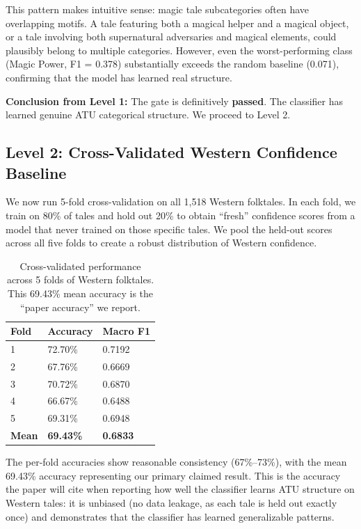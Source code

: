 \documentclass{article}
\begin{document}
This pattern makes intuitive sense: magic tale subcategories often have overlapping motifs. A tale featuring both a magical helper and a magical object, or a tale involving both supernatural adversaries and magical elements, could plausibly belong to multiple categories. However, even the worst-performing class (Magic Power, F1 = 0.378) substantially exceeds the random baseline (0.071), confirming that the model has learned real structure.

\textbf{Conclusion from Level 1:} The gate is definitively \textbf{passed}. The classifier has learned genuine ATU categorical structure. We proceed to Level 2.

\subsection{Level 2: Cross-Validated Western Confidence Baseline}

We now run 5-fold cross-validation on all 1,518 Western folktales. In each fold, we train on 80\% of tales and hold out 20\% to obtain ``fresh'' confidence scores from a model that never trained on those specific tales. We pool the held-out scores across all five folds to create a robust distribution of Western confidence.

\begin{table}[h]
\centering
\small
\begin{tabular}{lll}
\toprule
\textbf{Fold} & \textbf{Accuracy} & \textbf{Macro F1} \\
\midrule
1 & 72.70\% & 0.7192 \\
2 & 67.76\% & 0.6669 \\
3 & 70.72\% & 0.6870 \\
4 & 66.67\% & 0.6488 \\
5 & 69.31\% & 0.6948 \\
\midrule
\textbf{Mean} & \textbf{69.43\%} & \textbf{0.6833} \\
\bottomrule
\end{tabular}
\caption{Cross-validated performance across 5 folds of Western folktales. This 69.43\% mean accuracy is the ``paper accuracy'' we report.}
\label{tab:cv_performance}
\end{table}

The per-fold accuracies show reasonable consistency (67\%--73\%), with the mean 69.43\% accuracy representing our primary claimed result. This is the accuracy the paper will cite when reporting how well the classifier learns ATU structure on Western tales: it is unbiased (no data leakage, as each tale is held out exactly once) and demonstrates that the classifier has learned generalizable patterns.
\end{document}
